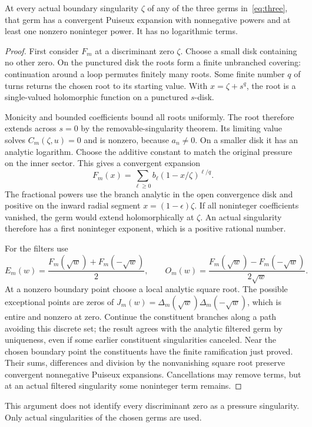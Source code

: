 \documentclass[11pt,a4paper]{article}
\theoremstyle{remark}\newtheorem*{ednote}{Editorial note (ProveIt, 2026-10-01)}
\begin{document}
\begin{lemma}\label{lem:puiseux}
At every actual boundary singularity $\zeta$ of any of the three germs in~\eqref{eq:three}, that germ has a convergent Puiseux expansion with nonnegative powers and at least one nonzero noninteger power. It has no logarithmic terms.
\end{lemma}
\begin{proof}
First consider $F_m$ at a discriminant zero $\zeta$. Choose a small disk containing no other zero. On the punctured disk the roots form a finite unbranched covering: continuation around a loop permutes finitely many roots. Some finite number $q$ of turns returns the chosen root to its starting value. With $x=\zeta+s^q$, the root is a single-valued holomorphic function on a punctured $s$-disk.

Monicity and bounded coefficients bound all roots uniformly. The root therefore extends across $s=0$ by the removable-singularity theorem. Its limiting value solves $C_m(\zeta,u)=0$ and is nonzero, because $a_n\ne0$. On a smaller disk it has an analytic logarithm. Choose the additive constant to match the original pressure on the inner sector. This gives a convergent expansion
\[
 F_m(x)=\sum_{\ell\ge0}b_\ell(1-x/\zeta)^{\ell/q}.
\]
The fractional powers use the branch analytic in the open convergence disk and positive on the inward radial segment $x=(1-\epsilon)\zeta$. If all noninteger coefficients vanished, the germ would extend holomorphically at $\zeta$. An actual singularity therefore has a first noninteger exponent, which is a positive rational number.

For the filters use
\begin{equation}\label{eq:filters}
 E_m(w)=\frac{F_m(\sqrt w)+F_m(-\sqrt w)}2,\qquad
 O_m(w)=\frac{F_m(\sqrt w)-F_m(-\sqrt w)}{2\sqrt w}.
\end{equation}
At a nonzero boundary point choose a local analytic square root. The possible exceptional points are zeros of
$J_m(w)=\Delta_m(\sqrt w)\Delta_m(-\sqrt w)$, which is entire and nonzero at zero. Continue the constituent branches along a path avoiding this discrete set; the result agrees with the analytic filtered germ by uniqueness, even if some earlier constituent singularities canceled. Near the chosen boundary point the constituents have the finite ramification just proved. Their sums, differences and division by the nonvanishing square root preserve convergent nonnegative Puiseux expansions. Cancellations may remove terms, but at an actual filtered singularity some noninteger term remains.
\end{proof}
This argument does not identify every discriminant zero as a pressure singularity. Only actual singularities of the chosen germs are used.
\end{document}

